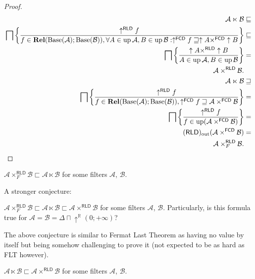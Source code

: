 \begin{proof}
~
\begin{align*}
\mathcal{A}\ltimes\mathcal{B} & \sqsubseteq\\
\bigsqcap\left\{ \frac{\uparrow^{\mathsf{RLD}}f}{f\in\mathbf{Rel}(\operatorname{Base}(\mathcal{A});\operatorname{Base}(\mathcal{B})),\forall A\in\operatorname{up}\mathcal{A},B\in\operatorname{up}\mathcal{B}:\uparrow^{\mathsf{FCD}}f\sqsupseteq\uparrow A\times^{\mathsf{FCD}}\uparrow B}\right\} & \sqsubseteq\\
\bigsqcap\left\{ \frac{\uparrow A\times^{\mathsf{RLD}}\uparrow B}{A\in\operatorname{up}\mathcal{A},B\in\operatorname{up}\mathcal{B}}\right\} & =\\
\mathcal{A}\times^{\mathsf{RLD}}\mathcal{B}.\\
\mathcal{A}\ltimes\mathcal{B} & \sqsupseteq\\
\bigsqcap\left\{ \frac{\uparrow^{\mathsf{RLD}}f}{f\in\mathbf{Rel}(\operatorname{Base}(\mathcal{A});\operatorname{Base}(\mathcal{B})),\uparrow^{\mathsf{FCD}}f\sqsupseteq\mathcal{A}\times^{\mathsf{FCD}}\mathcal{B}}\right\} & =\\
\bigsqcap\left\{ \frac{\uparrow^{\mathsf{RLD}}f}{f\in\operatorname{up}(\mathcal{A}\times^{\mathsf{FCD}}\mathcal{B})}\right\} & =\\
(\mathsf{RLD})_{\mathrm{out}}(\mathcal{A}\times^{\mathsf{FCD}}\mathcal{B}) & =\\
\mathcal{A}\times_{F}^{\mathsf{RLD}}\mathcal{B}.
\end{align*}
\end{proof}
\begin{conjecture}
$\mathcal{A}\times_{F}^{\mathsf{RLD}}\mathcal{B}\sqsubset\mathcal{A}\ltimes\mathcal{B}$
for some filters $\mathcal{A}$, $\mathcal{B}$.
\end{conjecture}
A stronger conjecture:
\begin{conjecture}
$\mathcal{A}\times_{F}^{\mathsf{RLD}}\mathcal{B}\sqsubset\mathcal{A}\ltimes\mathcal{B}\sqsubset\mathcal{A}\times^{\mathsf{RLD}}\mathcal{B}$
for some filters $\mathcal{A}$, $\mathcal{B}$. Particularly, is
this formula true for $\mathcal{A}=\mathcal{B}=\Delta\sqcap\uparrow^{\mathbb{R}}(0;+\infty)$?
\end{conjecture}
The above conjecture is similar to Fermat Last Theorem as having no
value by itself but being somehow challenging to prove it (not expected
to be as hard as FLT however).
\begin{example}
$\mathcal{A}\ltimes\mathcal{B}\sqsubset\mathcal{A}\times^{\mathsf{RLD}}\mathcal{B}$
for some filters $\mathcal{A}$, $\mathcal{B}$.\end{example}
